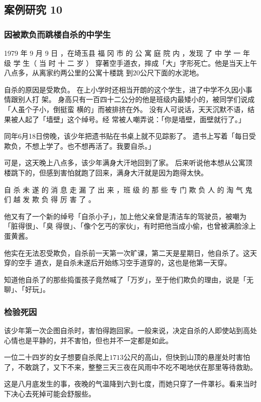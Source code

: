 \documentclass[UTF8]{ctexart}
\begin{document}
\subsection{案例研究 10}
\subsubsection*{因被欺负而跳楼自杀的中学生}

1979 年 9 月 9 日 ，在埼玉县 福 冈 市 的 公 寓 庭 院 内 ，发现 了 中 学 一 年 级 学 生（ 当 时 十 二 岁 ） 穿著空手道衣，摔成「大」字形死亡。他是当天上午八点多，从离家约两公里的公寓十楼跳 到$20$公尺下面的水泥地。

自杀的原因是受欺负。
在上小学时还相当开朗的这个学生，进了中学不久因小事情跟别人打 架。
身高只有一百四十二公分的他是班级内最矮小的，被同学们说成「人虽个子小，倒挺蛮 横的」而被排挤在外。
没有人可说话，天天沉默不语，结果被人起了「墙壁」这个绰号。经 常被人嘲弄说：「你是墙壁，面壁就行了。」

同年6月18日傍晚，该少年把遗书贴在书桌上就不见踪影了。
遗书上写着「每日受欺负，不想上学了。也不想再活了。我要自杀。」

可是，这天晚上八点多，该少年满身大汗地回到了家。
后来听说他本想从公寓顶楼跳下的，但感到害怕就跑了回来，满身大汗就是因为跑得太快。

自 杀 未 遂 的 消 息 走 漏 了 出 来 ，班 级 的 那 些 专 门 欺 负 人 的 淘 气 鬼 们 越 发 欺 负 得 厉 害 了 。

他又有了一个新的绰号「自杀小子」，加上他父亲曾是清洁车的驾驶员，被嘲为「脏得很」、「臭 得很」、「像个乞丐的家伙」，有时把他当成小偷，也曾被满脸涂上蛋黄酱。

他实在无法忍受欺负，自杀前一天第一次旷课，第二天是星期日，他自杀了。这天穿的空手 道衣，是自杀未遂后开始练习空手道穿的，这也是他第一天穿。

知道他自杀了的那些捣蛋孩子竟然喊了「万岁」，至于他们欺负的理由，说是「无聊」、「好玩」。


\subsubsection*{检验死因}

该少年第一次企图自杀时，害怕得跑回家。一般来说，决定自杀的人即使站到高处心情也是平静的，并不害怕，但也并不一定都是如此。

一位二十四岁的女子想要自杀爬上$1713$公尺的高山，但快到山顶的悬崖处时害怕了，不敢跳了，又下不来，整整三天三夜在风雨中不吃不喝地伏在那里等待救助。

这是八月底发生的事，夜晚的气温降到六到七度，而她只穿了一件罩衫。看来当时下决心去死掉可能会舒服些。
\end{document}

